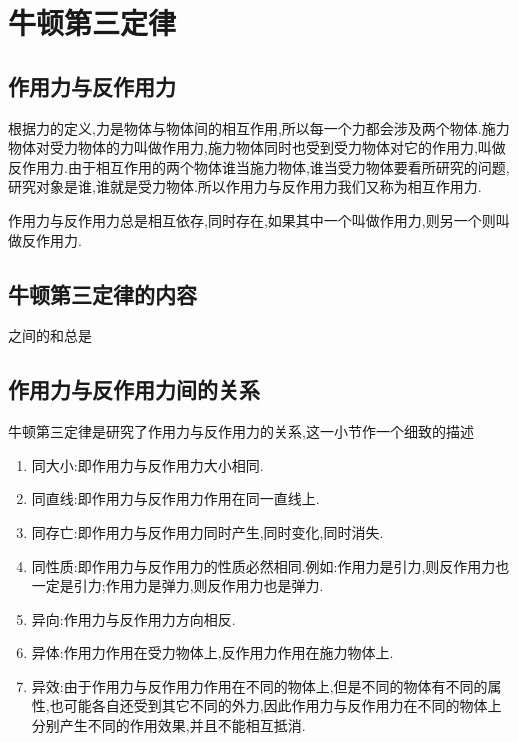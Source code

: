 \section{牛顿第三定律}
\subsection{作用力与反作用力}

根据力的定义,力是物体与物体间的相互作用,所以每一个力都会涉及两个物体.施力物体对受力物体的力叫做作用力,施力物体同时也受到受力物体对它的作用力,叫做反作用力.由于相互作用的两个物体谁当施力物体,谁当受力物体要看所研究的问题,研究对象是谁,谁就是受力物体.所以作用力与反作用力我们又称为相互作用力.

作用力与反作用力总是相互依存,同时存在,如果其中一个叫做作用力,则另一个则叫做反作用力.

\subsection{牛顿第三定律的内容}
之间的和总是

\subsection{作用力与反作用力间的关系}
牛顿第三定律是研究了作用力与反作用力的关系,这一小节作一个细致的描述
\begin{enumerate}
  \item 同大小:即作用力与反作用力大小相同.
  \item 同直线:即作用力与反作用力作用在同一直线上.
  \item 同存亡:即作用力与反作用力同时产生,同时变化,同时消失.
  \item 同性质:即作用力与反作用力的性质必然相同.例如:作用力是引力,则反作用力也一定是引力;作用力是弹力,则反作用力也是弹力.
  \item 异向:作用力与反作用力方向相反.
  \item 异体:作用力作用在受力物体上,反作用力作用在施力物体上.
  \item 异效:由于作用力与反作用力作用在不同的物体上,但是不同的物体有不同的属性,也可能各自还受到其它不同的外力,因此作用力与反作用力在不同的物体上分别产生不同的作用效果,并且不能相互抵消.
\end{enumerate}

